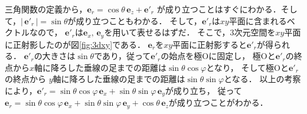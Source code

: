 三角関数の定義から，$\bm{e}_r = \cos \theta \, \bm{e}_z + \bm{e}'_r $
が成り立つことはすぐにわかる．そして，$| \, \bm{e}'_r \, | = \sin \theta$が成り立つこともわかる．
そして，$\bm{e}'_r$は$xy$平面に含まれるベクトルなので，
$\bm{e}'_r$は$\bm{e}_x, \, \bm{e}_y$を用いて表せるはずだ．
そこで，3次元空間を$xy$平面に正射影したのが図\ref{fig:3dxy}である．
$\bm{e}_r$を$xy$平面に正射影すると$\bm{e}'_r$が得られる．
$\bm{e}'_r$の大きさは$\sin \theta$であり，従って$\bm{e}'_r$の始点を極Oに固定し，
極Oと$\bm{e}'_r$の終点から$x$軸に降ろした垂線の足までの距離は$\sin \theta \cos \varphi$となり，
そして極Oと$\bm{e}'_r$の終点から
$y$軸に降ろした垂線の足までの距離は$\sin \theta \sin \varphi$となる．
以上の考察により，$\bm{e}'_r = \sin \theta \cos \varphi \, \bm{e}_x 
+ \sin \theta \sin \varphi \, \bm{e}_y$が成り立ち，
従って$\bm{e}_r = \sin \theta \cos \varphi \, \bm{e}_x + \sin \theta \sin \varphi \, \bm{e}_y 
+ \cos \theta \, \bm{e}_z$が成り立つことがわかる．

